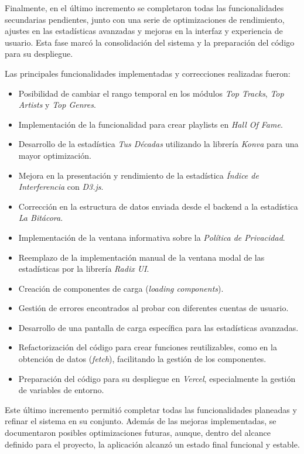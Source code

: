 Finalmente, en el último incremento se completaron todas las funcionalidades secundarias pendientes, junto con una serie de optimizaciones de rendimiento, ajustes en las estadísticas avanzadas y mejoras en la interfaz y experiencia de usuario. Esta fase marcó la consolidación del sistema y la preparación del código para su despliegue.

Las principales funcionalidades implementadas y correcciones realizadas fueron:

\setlength{\itemsep}{0pt}
\begin{itemize}
    \item Posibilidad de cambiar el rango temporal en los módulos \textit{Top Tracks}, \textit{Top Artists} y \textit{Top Genres}.
    \item Implementación de la funcionalidad para crear playlists en \textit{Hall Of Fame}.
    \item Desarrollo de la estadística \textit{Tus Décadas} utilizando la librería \textit{Konva} para una mayor optimización.
    \item Mejora en la presentación y rendimiento de la estadística \textit{Índice de Interferencia} con \textit{D3.js}.
    \item Corrección en la estructura de datos enviada desde el backend a la estadística \textit{La Bitácora}.
    \item Implementación de la ventana informativa sobre la \textit{Política de Privacidad}.
    \item Reemplazo de la implementación manual de la ventana modal de las estadísticas por la librería \textit{Radix UI}.
    \item Creación de componentes de carga (\textit{loading components}).
    \item Gestión de errores encontrados al probar con diferentes cuentas de usuario.
    \item Desarrollo de una pantalla de carga específica para las estadísticas avanzadas.
    \item Refactorización del código para crear funciones reutilizables, como en la obtención de datos (\textit{fetch}), facilitando la gestión de los componentes.
    \item Preparación del código para su despliegue en \textit{Vercel}, especialmente la gestión de variables de entorno.
\end{itemize}

Este último incremento permitió completar todas las funcionalidades planeadas y refinar el sistema en su conjunto. Además de las mejoras implementadas, se documentaron posibles optimizaciones futuras, aunque, dentro del alcance definido para el proyecto, la aplicación alcanzó un estado final funcional y estable.

